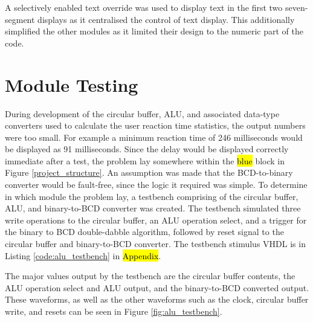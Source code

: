 \documentclass[11pt]{article}
\begin{document}
A selectively enabled text override was used to display text in the first two seven-segment displays as it centralised the control of text display. This additionally simplified the other modules as it limited their design to the numeric part of the code.


\section{Module Testing}


During development of the circular buffer, ALU, and associated data-type converters used to calculate the user reaction time statistics, the output numbers were too small. For example a minimum reaction time of 246 milliseconds would be displayed as 91 milliseconds. Since the delay would be displayed correctly immediate after a test, the problem lay somewhere within the \hl{blue} block in Figure \ref{project_structure}. An assumption was made that the BCD-to-binary converter would be fault-free, since the logic it required was simple. To determine in which module the problem lay, a testbench comprising of the circular buffer, ALU, and binary-to-BCD converter was created. The testbench simulated three write operations to the circular buffer, an ALU operation select, and a trigger for the binary to BCD double-dabble algorithm, followed by reset signal to the circular buffer and binary-to-BCD converter. The testbench stimulus VHDL is in Listing \ref{code:alu_testbench} in \hl{Appendix}.

The major values output by the testbench are the circular buffer contents, the ALU operation select and ALU output, and the binary-to-BCD converted output. These waveforms, as well as the other waveforms such as the clock, circular buffer write, and resets can be seen in Figure \ref{fig:alu_testbench}.
\end{document}
